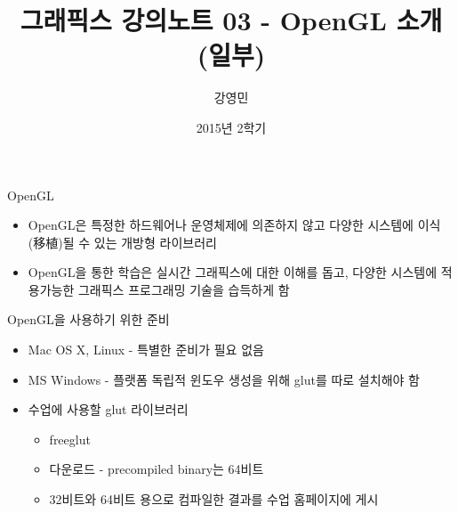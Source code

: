 \documentclass{beamer}
\title[3D 그래픽스 프로그래밍]{그래픽스 강의노트 03 - OpenGL 소개 (일부)}
\author{강영민}
\institute{동명대학교}
\date{2015년 2학기}
\begin{document}
\begin{frame}
  \titlepage
\end{frame}



\begin{frame}{OpenGL}

\begin{itemize}
\item OpenGL은 특정한 하드웨어나 운영체제에 의존하지 않고 다양한 시스템에 이식(移植)될 수 있는 개방형 라이브러리
\item OpenGL을 통한 학습은 실시간 그래픽스에 대한 이해를 돕고, 다양한 시스템에 적용가능한 그래픽스 프로그래밍 기술을 습득하게 함
\end{itemize}
\end{frame}

\begin{frame}{OpenGL을 사용하기 위한 준비}

\begin{itemize}
\item Mac OS X, Linux - 특별한 준비가 필요 없음
\item MS Windows - 플랫폼 독립적 윈도우 생성을 위해 glut를 따로 설치해야 함
\end{itemize}


\begin{itemize}
\item 수업에 사용할 glut 라이브러리
	\begin{itemize}
	\item freeglut
	\item 다운로드 - precompiled binary는 64비트 
	\item 32비트와 64비트 용으로 컴파일한 결과를 수업 홈페이지에 게시
	\end{itemize}
\end{itemize}

\end{frame}
\end{document}
